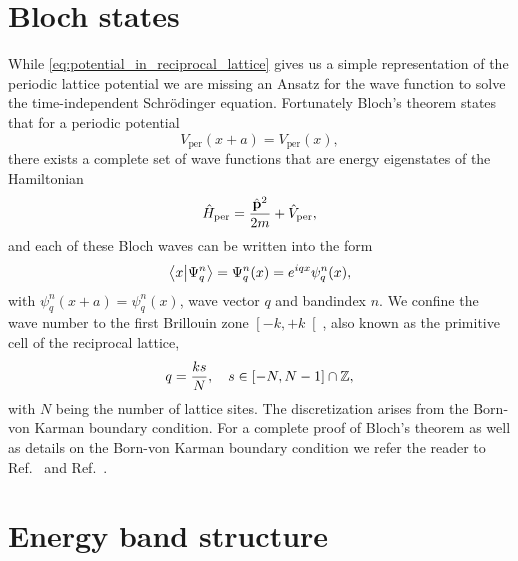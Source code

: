 \section{Bloch states}

While \cref{eq:potential_in_reciprocal_lattice} gives us a simple representation
of the periodic lattice potential we are missing an Ansatz for the wave
function to solve the time-independent Schrödinger equation. Fortunately
Bloch's theorem states that for a periodic potential
\begin{equation}
  V_\text{per}(x+a)=V_\text{per}(x)
  \label{eq:potential_periodic},
\end{equation}
there exists a complete set of wave functions that are energy eigenstates
of the Hamiltonian
\begin{equation}
  \hat{H}_\text{per}
  =\frac{\hat{\vb{p}}^2}{2m}+\hat{V}_\text{per}
  \label{eq:hamiltonian_periodic},
\end{equation}
and each of these Bloch waves can be written into the form
\begin{equation}
  \bra{x}\ket{\Psi^n_q}
  =\Psi^n_q(x)
  =e^{iqx}\psi^n_q(x)
  \label{eq:state_bloch},
\end{equation}
with $\psi^n_q(x+a)=\psi^n_q(x)$, wave vector $q$ and bandindex $n$. We
confine the wave number to the first Brillouin zone $\left[-k,+k\right[$,
also known as the primitive cell of the reciprocal lattice,
\begin{equation}
  q=\frac{ks}{N}
  \qc s\in\left[-N,N-1\right]\cap\mathbb{Z}
  \label{eq:wavenumber_quasi},
\end{equation}
with $N$ being the number of lattice sites. The discretization arises from
the Born-von Karman boundary condition. For a complete proof of Bloch's
theorem as well as details on the Born-von Karman boundary condition we refer
the reader to Ref.~\cite{Roessler2004} and Ref.~\cite{Bartelmann2018}.

\section{Energy band structure}

